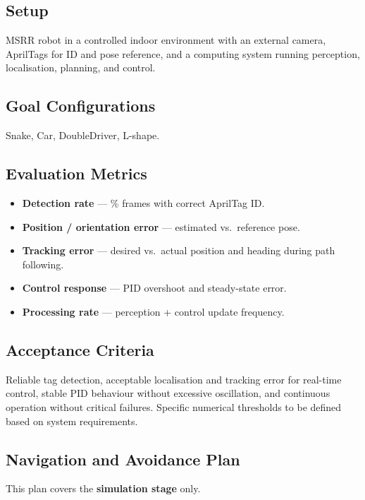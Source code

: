 \documentclass[12pt,a4paper]{article}
\begin{document}
\subsection{Setup}

MSRR robot in a controlled indoor environment with an external camera, AprilTags for ID and pose reference, and a computing system running perception, localisation, planning, and control.

\subsection{Goal Configurations}

Snake, Car, DoubleDriver, L-shape.

\subsection{Evaluation Metrics}

\begin{itemize}
\item \textbf{Detection rate} --- \% frames with correct AprilTag ID.
\item \textbf{Position / orientation error} --- estimated vs.\ reference pose.
\item \textbf{Tracking error} --- desired vs.\ actual position and heading during path following.
\item \textbf{Control response} --- PID overshoot and steady-state error.
\item \textbf{Processing rate} --- perception + control update frequency.
\end{itemize}

\subsection{Acceptance Criteria}

Reliable tag detection, acceptable localisation and tracking error for real-time control, stable PID behaviour without excessive oscillation, and continuous operation without critical failures. Specific numerical thresholds to be defined based on system requirements.

\subsection{Navigation and Avoidance Plan}
\label{sec:nav-plan}

This plan covers the \textbf{simulation stage} only.
\end{document}
